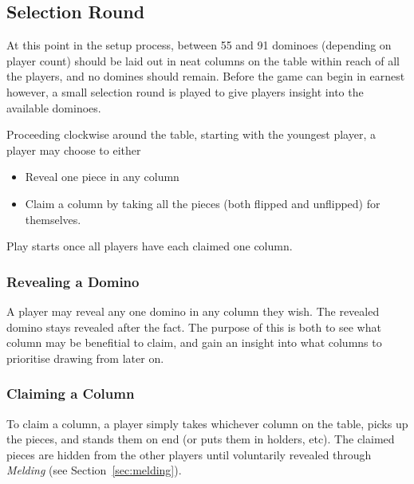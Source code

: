 \subsection{Selection Round}
At this point in the setup process, between 55 and 91 dominoes (depending on player count) should be laid out in neat columns on the table within reach of all the players, and no domines should remain.
Before the game can begin in earnest however, a small selection round is played to give players insight into the available dominoes.

Proceeding clockwise around the table, starting with the youngest player, a player may choose to either 
\begin{itemize} 
\item Reveal one piece in any column
\item Claim a column by taking all the pieces (both flipped and unflipped) for themselves.
\end{itemize}
Play starts once all players have each claimed one column.

\subsubsection{Revealing a Domino}
A player may reveal any one domino in any column they wish.
The revealed domino stays revealed after the fact.
The purpose of this is both to see what column may be benefitial to claim, and gain an insight into what columns to prioritise drawing from later on.

\subsubsection{Claiming a Column}
To claim a column, a player simply takes whichever column on the table, picks up the pieces, and stands them on end (or puts them in holders, etc).
The claimed pieces are hidden from the other players until voluntarily revealed through \textit{Melding} (see Section~\ref{sec:melding}).